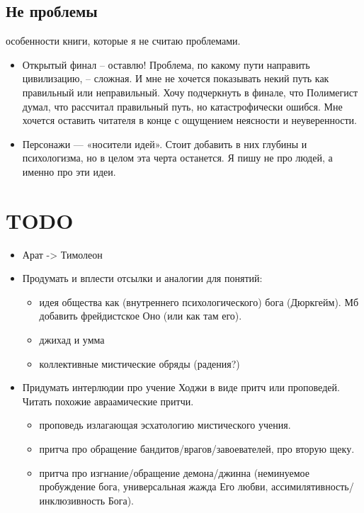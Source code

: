 \documentclass[12pt,a4paper]{article}
\begin{document}
\subsection*{Не проблемы}
особенности книги, которые я не считаю проблемами.

\begin{itemize}
	\item Открытый финал -- оставлю! Проблема, по какому пути направить цивилизацию, -- сложная. И мне не хочется показывать некий путь как правильный или неправильный. Хочу подчеркнуть в финале, что Полимегист думал, что рассчитал правильный путь, но катастрофически ошибся. Мне хочется оставить читателя в конце с ощущением неясности и неуверенности.
	\item Персонажи — «носители идей». Стоит добавить в них глубины и психологизма, но в целом эта черта останется. Я пишу не про людей, а именно про эти идеи.
\end{itemize}

\section*{TODO}
\begin{itemize}
	\item Арат -> Тимолеон
	\item Продумать и вплести отсылки и аналогии для понятий:
	\begin{itemize}
		\item идея общества как (внутреннего психологического) бога (Дюркгейм). Мб добавить фрейдистское Оно (или как там его).
		\item джихад и умма
		\item коллективные мистические обряды (радения?)
	\end{itemize}
	\item Придумать интерлюдии про учение Ходжи в виде притч или проповедей. Читать похожие авраамические притчи.
	\begin{itemize}
		\item проповедь излагающая эсхатологию мистического учения.
		\item притча про обращение бандитов/врагов/завоевателей, про вторую щеку.
		\item притча про изгнание/обращение демона/джинна (неминуемое пробуждение бога, универсальная жажда Его любви, ассимилятивность/инклюзивность Бога).
\end{itemize}
\end{itemize}
\end{document}

